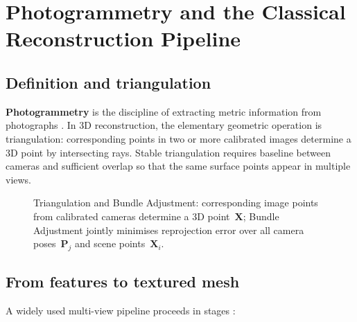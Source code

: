 \section{Photogrammetry and the Classical Reconstruction Pipeline}
\label{sec:photogrammetry}

\subsection{Definition and triangulation}

\textbf{Photogrammetry} is the discipline of extracting metric information from photographs \cite{luhmann2014photogrammetry}. In 3D reconstruction, the elementary geometric operation is 
triangulation: corresponding points in two or more calibrated images determine a 3D point by intersecting rays. Stable triangulation requires baseline between cameras and sufficient overlap so that the same surface points appear in multiple views.
\begin{figure}[htbp]
\centering

\caption{Triangulation and Bundle Adjustment: corresponding image points from calibrated cameras determine a 3D point~$\mathbf{X}$; Bundle Adjustment jointly minimises reprojection error over all camera poses~$\mathbf{P}_j$ and scene points~$\mathbf{X}_i$.}
\label{fig:ch2_photo_concept}
\end{figure}

\subsection{From features to textured mesh}

A widely used multi-view pipeline proceeds in stages \cite{luhmann2014photogrammetry,lowe2004sift,furukawa2010pmvs,kazhdan2006poisson}:

